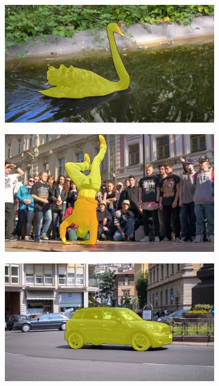 \begin{figure}
\centering
\begin{subfigure}{0.25\textwidth}
  \includegraphics[width=1.\linewidth]{figures/davis_dataset/blackswan.jpg}
\end{subfigure}%
\begin{subfigure}{0.25\textwidth}
  \includegraphics[width=1.\linewidth]{figures/davis_dataset/breakdance.jpg}
\end{subfigure}%
\begin{subfigure}{0.25\textwidth}
  \includegraphics[width=1.\linewidth]{figures/davis_dataset/car-roundabout.jpg}

\end{subfigure}
\end{figure}
